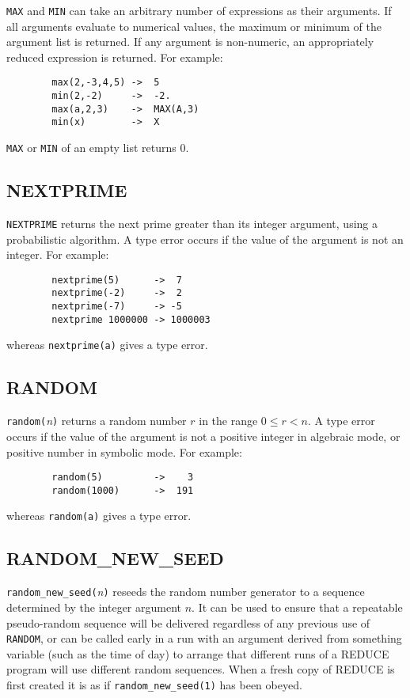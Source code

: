 \texttt{MAX} and \texttt{MIN} can take an arbitrary
number of expressions as their arguments.  If all arguments evaluate to
numerical values, the maximum or minimum of the argument list is returned.
If any argument is non-numeric, an appropriately reduced expression is
returned.  For example:
\begin{verbatim}
        max(2,-3,4,5) ->  5
        min(2,-2)     ->  -2.
        max(a,2,3)    ->  MAX(A,3)
        min(x)        ->  X
\end{verbatim}
\texttt{MAX} or \texttt{MIN} of an empty list returns 0.

\subsection{NEXTPRIME}
\hypertarget{operator:NEXTPRIME}{}

\texttt{NEXTPRIME} returns the next prime greater than its integer argument,
using a probabilistic algorithm.  A type error occurs if the value of the
argument is not an integer.  For example:
\begin{verbatim}
        nextprime(5)      ->  7
        nextprime(-2)     ->  2
        nextprime(-7)     -> -5
        nextprime 1000000 -> 1000003
\end{verbatim}
whereas \texttt{nextprime(a)} gives a type error.

\subsection{RANDOM}
\hypertarget{operator:RANDOM}{}

\texttt{random(}{\em n\/}\texttt{)} returns a random number $r$ in the
range $0\leq r < n$.  A type error occurs if the value of the argument is not a
positive integer in algebraic mode, or positive number in symbolic mode.
For example:
\begin{verbatim}
        random(5)         ->    3
        random(1000)      ->  191
\end{verbatim}
whereas \texttt{random(a)} gives a type error.

\subsection{RANDOM\_NEW\_SEED}
\hypertarget{operator:RANDOM_NEW_SEED}{}

\texttt{random\_new\_seed(}\emph{n}\texttt{)} reseeds the random number
generator
to a sequence determined by the integer argument $n$.  It can be used to
ensure that a repeatable pseudo-random sequence will be delivered
regardless of any previous use of \texttt{RANDOM}, or can be called early in
a run with an argument derived from something variable (such as the time
of day) to arrange that different runs of a REDUCE program will use
different random sequences.  When a fresh copy of REDUCE is first created
it is as if \texttt{random\_new\_seed(1)} has been obeyed.

